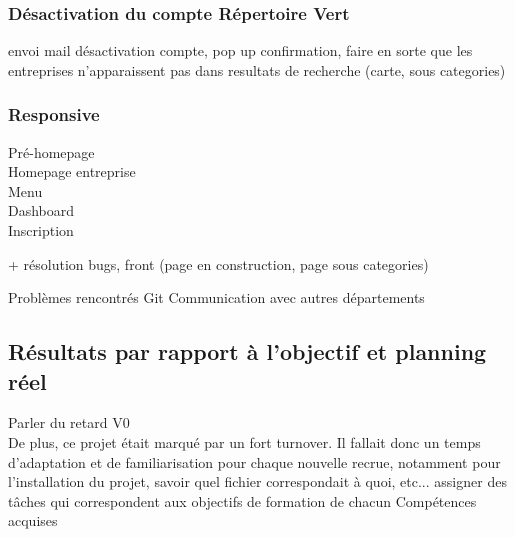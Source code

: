 \subsubsection{Désactivation du compte Répertoire Vert}
envoi mail désactivation compte, pop up confirmation, faire en sorte que les entreprises n'apparaissent pas dans resultats de recherche (carte, sous categories)

\subsubsection{Responsive}
Pré-homepage\\
Homepage entreprise\\
Menu\\
Dashboard\\
Inscription


+ résolution bugs, front (page en construction, page sous categories)



Problèmes rencontrés
Git
Communication avec autres départements

\pagebreak
\subsection{Résultats par rapport à l'objectif et planning réel}

Parler du retard V0
\\De plus, ce projet était marqué par un fort turnover. Il fallait donc un temps d'adaptation et de familiarisation pour chaque nouvelle recrue, notamment pour l'installation du projet, savoir quel fichier correspondait à quoi, etc...
assigner des tâches qui correspondent aux objectifs de formation de chacun
Compétences acquises




